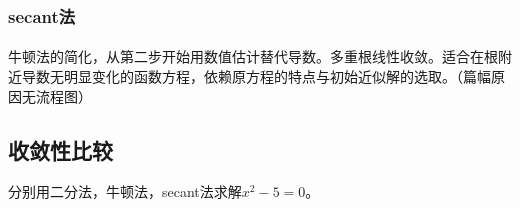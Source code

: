 \documentclass{article}
\begin{document}
		\subsubsection{secant法}
		\paragraph{}牛顿法的简化，从第二步开始用数值估计替代导数。多重根线性收敛。适合在根附近导数无明显变化的函数方程，依赖原方程的特点与初始近似解的选取。（篇幅原因无流程图）
			 
			
	\subsection{收敛性比较}
	分别用二分法，牛顿法，secant法求解$x^2-5=0$。\cite{R2}
		
\end{document}
